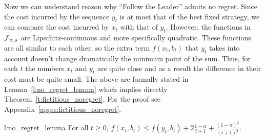 Now we can understand reason why \enquote{Follow the Leader}
admits no regret. Since the cost incurred by the sequence $y_t$ is at most that
of the best fixed strategy, we can compare the cost incurred by $x_t$ with
that of $y_t$.  However, the functions in $\mathcal{F}_{\alpha,s}$ are
Lipschitz-continuous and more specifically quadratic.
These functions are all similar to each other, so the extra
term $f(x_t,b_t)$ that $y_t$ takes into account doesn't change
dramatically the minimum point of the sum. Thus, for each $t$ the
numbers $x_t$ and $y_t$ are quite close and as a result the
difference in their cost must be quite small. The above are
formally stated in Lemma~\ref{l:no_regret_lemma}
which implies directly Theorem~\ref{t:fictitious_noregret}.
For the proof see Appendix~\ref{app:s:fictitious_noregret}.
\begin{replemma}{l:no_regret_lemma}
  For all $t\geq 0$,
  \(
    f(x_t,b_t) \leq f(y_t,b_t) + 2\frac{1-\alpha}{t+1} +
    \frac{(1-\alpha)^2}{(t+1)^2}
  \).
\end{replemma}

